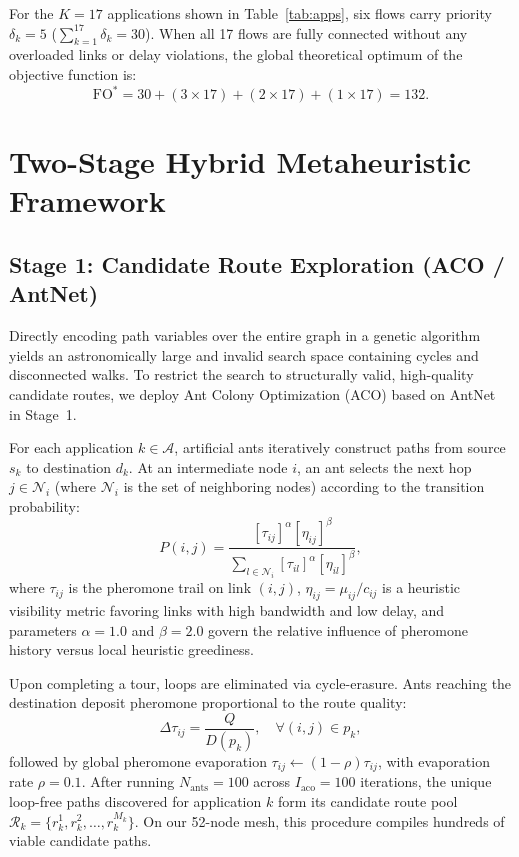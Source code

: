 \documentclass[journal]{IEEEtran}
\newcommand{\FO}{\mathrm{FO}}
\begin{document}
For the $K = 17$ applications shown in Table~\ref{tab:apps}, six flows carry priority $\delta_k = 5$ ($\sum_{k=1}^{17} \delta_k = 30$). When all 17 flows are fully connected without any overloaded links or delay violations, the global theoretical optimum of the objective function is:
\begin{equation}
\FO^* = 30 + (3 \times 17) + (2 \times 17) + (1 \times 17) = 132.
\end{equation}

\section{Two-Stage Hybrid Metaheuristic Framework}
\label{sec:methodology}

\subsection{Stage 1: Candidate Route Exploration (ACO / AntNet)}
Directly encoding path variables over the entire graph in a genetic algorithm yields an astronomically large and invalid search space containing cycles and disconnected walks. To restrict the search to structurally valid, high-quality candidate routes, we deploy Ant Colony Optimization (ACO) based on AntNet~\cite{dicaro1998antnet} in Stage~1.

For each application $k \in \mathcal{A}$, artificial ants iteratively construct paths from source $s_k$ to destination $d_k$. At an intermediate node $i$, an ant selects the next hop $j \in \mathcal{N}_i$ (where $\mathcal{N}_i$ is the set of neighboring nodes) according to the transition probability:
\begin{equation}
P(i, j) = \frac{[\tau_{ij}]^\alpha [\eta_{ij}]^\beta}{\sum_{l \in \mathcal{N}_i} [\tau_{il}]^\alpha [\eta_{il}]^\beta},
\label{eq:aco_prob}
\end{equation}
where $\tau_{ij}$ is the pheromone trail on link $(i, j)$, $\eta_{ij} = \mu_{ij} / c_{ij}$ is a heuristic visibility metric favoring links with high bandwidth and low delay, and parameters $\alpha = 1.0$ and $\beta = 2.0$ govern the relative influence of pheromone history versus local heuristic greediness.

Upon completing a tour, loops are eliminated via cycle-erasure. Ants reaching the destination deposit pheromone proportional to the route quality:
\begin{equation}
\Delta \tau_{ij} = \frac{Q}{D(p_k)}, \quad \forall (i, j) \in p_k,
\end{equation}
followed by global pheromone evaporation $\tau_{ij} \leftarrow (1 - \rho)\tau_{ij}$, with evaporation rate $\rho = 0.1$. After running $N_{\text{ants}} = 100$ across $I_{\text{aco}} = 100$ iterations, the unique loop-free paths discovered for application $k$ form its candidate route pool $\mathcal{R}_k = \{r_k^1, r_k^2, \dots, r_k^{M_k}\}$. On our 52-node mesh, this procedure compiles hundreds of viable candidate paths.
\end{document}
